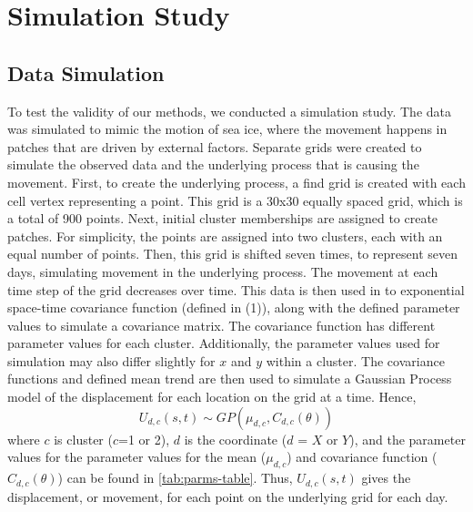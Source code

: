 \documentclass[12pt]{article}
\begin{document}
\hypertarget{simulation}{%
\section{Simulation Study}\label{simulation}}

\hypertarget{data-simulation}{%
\subsection{Data Simulation}\label{data-simulation}}

To test the validity of our methods, we conducted a simulation study.
The data was simulated to mimic the motion of sea ice, where the
movement happens in patches that are driven by external factors.
Separate grids were created to simulate the observed data and the
underlying process that is causing the movement. First, to create the
underlying process, a find grid is created with each cell vertex
representing a point. This grid is a 30x30 equally spaced grid, which is
a total of 900 points. Next, initial cluster memberships are assigned to
create patches. For simplicity, the points are assigned into two
clusters, each with an equal number of points. Then, this grid is
shifted seven times, to represent seven days, simulating movement in the
underlying process. The movement at each time step of the grid decreases
over time. This data is then used in to exponential space-time
covariance function (defined in (1)), along with the defined parameter
values to simulate a covariance matrix. The covariance function has
different parameter values for each cluster. Additionally, the parameter
values used for simulation may also differ slightly for \(x\) and \(y\)
within a cluster. The covariance functions and defined mean trend are
then used to simulate a Gaussian Process model of the displacement for
each location on the grid at a time. Hence,
\[ U_{d,c}(s,t) \sim GP(\mu_{d,c}, C_{d,c}(\theta))\] where \(c\) is
cluster (\(c\)=1 or 2), \(d\) is the coordinate (\(d\) = \(X\) or
\(Y\)), and the parameter values for the parameter values for the mean
(\(\mu_{d,c}\)) and covariance function (\(C_{d,c}(\theta)\)) can be
found in \cref{tab:parms-table}. Thus, \(U_{d,c}(s,t)\) gives the
displacement, or movement, for each point on the underlying grid for
each day.
\end{document}
